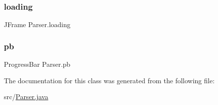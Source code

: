 \hypertarget{class_parser_aa186fb30f99abea1ad8923a549d26f30}{}\label{class_parser_aa186fb30f99abea1ad8923a549d26f30} 
\subsubsection{\texorpdfstring{loading}{loading}}
{\footnotesize\ttfamily J\+Frame Parser.\+loading\hspace{0.3cm}{\ttfamily [private]}}

\hypertarget{class_parser_a8e77019b8dfc3cc2a8c2bbc01ff5a657}{}\label{class_parser_a8e77019b8dfc3cc2a8c2bbc01ff5a657} 
\subsubsection{\texorpdfstring{pb}{pb}}
{\footnotesize\ttfamily Progress\+Bar Parser.\+pb\hspace{0.3cm}{\ttfamily [private]}}



The documentation for this class was generated from the following file\+:\begin{DoxyCompactItemize}
\item 
src/\hyperlink{_parser_8java}{Parser.\+java}\end{DoxyCompactItemize}
